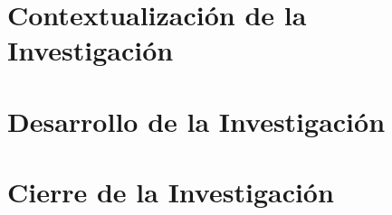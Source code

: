 \documentclass [12pt,letterpaper,oneside]{book}
\begin{document}
    \newpage
    
    \newpage
    \tableofcontents
    \newpage
    \listoffigures
    \newpage
    \part{Contextualización de la Investigación}
    	
    \part{Desarrollo de la Investigación}
    	
    \part{Cierre de la Investigación}
	    
\end{document}

